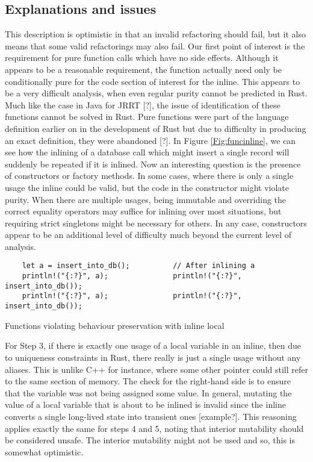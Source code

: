\subsection{Explanations and issues}\label{S:inlineissues}
This description is optimistic in that an invalid refactoring should fail, but it also means that some valid refactorings may also fail. Our first point of interest is the requirement for pure function calls which have no side effects. Although it appears to be a reasonable requirement, the function actually need only be conditionally pure for the code section of interest for the inline. This appears to be a very difficult analysis, when even regular purity cannot be predicted in Rust. Much like the case in Java for JRRT [?], the issue of identification of these functions cannot be solved in Rust. Pure functions were part of the language definition earlier on in the development of Rust but due to difficulty in producing an exact definition, they were abandoned [?]. In Figure \ref{Fig:funcinline}, we can see how the inlining of a database call which might insert a single record will suddenly be repeated if it is inlined. Now an interesting question is the presence of constructors or factory methods. In some cases, where there is only a single usage the inline could be valid, but the code in the constructor might violate purity. When there are multiple usages, being immutable and overriding the correct equality operators may suffice for inlining over most situations, but requiring strict singletons might be necessary for others. In any case, constructors appear to be an additional level of difficulty much beyond the current level of analysis.

\begin{fig}[H]
\begin{verbatim}
    let a = insert_into_db();          // After inlining a
    println!("{:?}", a);               println!("{:?}", insert_into_db());
    println!("{:?}", a);               println!("{:?}", insert_into_db());
\end{verbatim}
\caption{Functions violating behaviour preservation with inline local}
\label{Fig:funcinline}
\end{fig}

For Step 3, if there is exactly one usage of a local variable in an inline, then due to uniqueness constraints in Rust, there really is just a single usage without any aliases. This is unlike C++ for instance, where some other pointer could still refer to the same section of memory. The check for the right-hand side is to ensure that the variable was not being assigned some value. In general, mutating the value of a local variable that is about to be inlined is invalid since the inline converts a single long-lived state into transient ones [example?]. This reasoning applies exactly the same for steps 4 and 5, noting that interior mutability should be considered unsafe. The interior mutability might not be used and so, this is somewhat optimistic.

